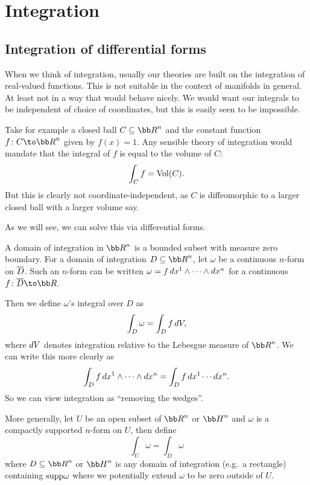 \section{Integration}

\subsection{Integration of differential forms}

When we think of integration, usually our theories are built on the integration of real-valued functions.
This is not suitable in the context of manifolds in general.
At least not in a way that would behave nicely.
We would want our integrals to be independent of choice of coordinates, but this is easily seen to be impossible.

Take for example a closed ball $C\subseteq\bR^n$ and the constant function $f\colon C\to\bR^n$ given by $f(x)=1$.
Any sensible theory of integration would mandate that the integral of $f$ is equal to the volume of $C$:
$$ \int_Cf = {\rm Vol}(C) . $$
But this is clearly not coordinate-independent, as $C$ is diffeomorphic to a larger closed ball with a larger volume say.

As we will see, we can solve this via differential forms.

\bdefn

    A {\emphcolor domain of integration} in $\bR^n$ is a bounded subset with measure zero boundary.
    For a domain of integration $D\subseteq\bR^n$, let $\omega$ be a continuous $n$-form on $\overline D$.
    Such an $n$-form can be written $\omega=f\mathop{}\!d x^1\wedge\cdots\wedge\mathop{}\!d x^n$ for a continuous $f\colon\cl D\to\bR$.

    Then we define $\omega$'s {\emphcolor integral} over $D$ as
    $$ \int_D\omega = \int_Df\mathop{}\!d V, $$
    where $\mathop{}\!d V$ denotes integration relative to the Lebesgue measure of $\bR^n$.
    We can write this more clearly as
    $$ \int_Df\mathop{}\!d x^1\wedge\cdots\wedge\mathop{}\!d x^n = \int_Df\mathop{}\!d x^1\cdots\mathop{}\!d x^n . $$
    So we can view integration as ``removing the wedges''.

    More generally, let $U$ be an open subset of $\bR^n$ or $\bH^n$ and $\omega$ is a compactly supported $n$-form
    on $U$, then define
    $$ \int_U\omega = \int_D\omega $$
    where $D\subseteq\bR^n$ or $\bH^n$ is any domain of integration (e.g.\ a rectangle) containing ${\rm supp}\omega$
    where we potentially extend $\omega$ to be zero outside of $U$.

\edefn

